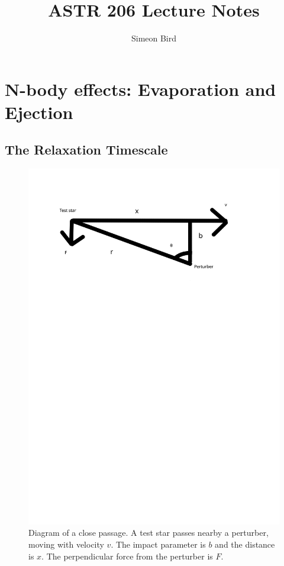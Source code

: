 \documentclass[12pt]{article}
\title{ASTR 206 Lecture Notes}
\author{Simeon Bird}
\begin{document}
\maketitle

\section{N-body effects: Evaporation and Ejection}
\subsection{The Relaxation Timescale}
\begin{figure}
\includegraphics[trim={1cm 20cm 0.5cm 2.5cm},clip,scale=0.7]{BH_perturber.png}
\centering
\caption{Diagram of a close passage. A test star passes nearby a perturber, moving with velocity $v$. The impact parameter is $b$ and the distance is $x$. The perpendicular force from the perturber is $F$.}
\label{fig:close}
\end{figure}
\end{document}
